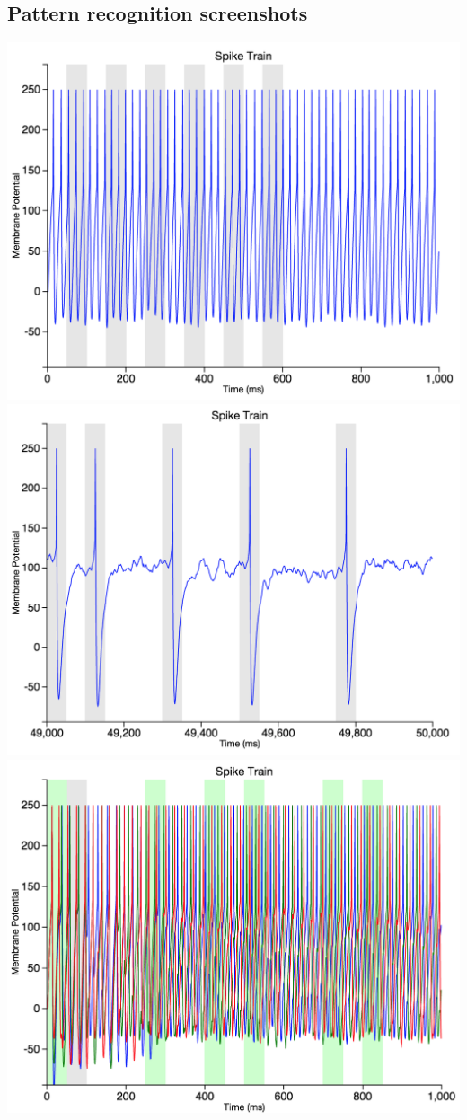 \documentclass[a4paper,11pt]{article}
\begin{document}
\begin{appendices}
\section{Pattern recognition screenshots}
\includegraphics{single_pattern_beginning}
\includegraphics{single_pattern_end}
\includegraphics{multiple_beginning}

\end{appendices}
\end{document}
